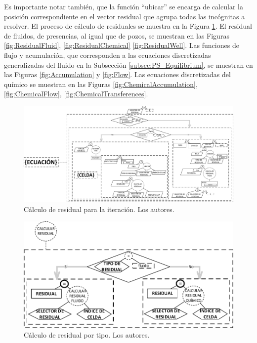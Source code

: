 Es importante notar también, que la función ``ubicar'' se encarga de calcular la posición correspondiente en el vector residual que agrupa todas las incógnitas a resolver. El proceso de cálculo de residuales se muestra en la Figura \ref{fig:Residual}. El residual de fluidos, de presencias, al igual que de pozos, se muestran en las Figuras \ref{fig:ResidualFluid}, \ref{fig:ResidualChemical} \ref{fig:ResidualWell}. Las funciones de flujo y acumulación, que corresponden a las ecuaciones discretizadas generalizadas del fluido en la Subsección \ref{subsec:PS_Equilibrium}, se muestran en las Figuras \ref{fig:Accumulation} y \ref{fig:Flow}. Las ecuaciones discretizadas del químico se muestran en las Figuras \ref{fig:ChemicalAccumulation}, \ref{fig:ChemicalFlow}, \ref{fig:ChemicalTransferences}.\\ %

\begin{figure}[h]
	\centering%
	\includegraphics[width=\linewidth]{Fig/Residual.pdf}%
	\caption[Cálculo de residual para la iteración.]{Cálculo de residual para la iteración. Los autores.} \label{fig:Residual}
\end{figure}


\begin{figure}[h]
	\centering%
	\includegraphics[width=0.7\linewidth]{Fig/CalcularResidual.pdf}%
	\caption[Cálculo de residual por tipo.]{Cálculo de residual por tipo. Los autores.} \label{fig:CalResidual}
\end{figure}

